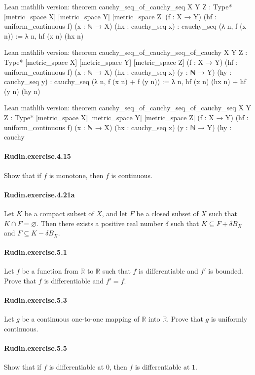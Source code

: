 \documentclass{article}
\begin{document}
Lean mathlib version:
theorem cauchy_seq_of_cauchy_seq {X Y Z : Type*} [metric_space X] [metric_space Y] [metric_space Z]
  (f : X → Y) (hf : uniform_continuous f)
  (x : ℕ → X) (hx : cauchy_seq x) : cauchy_seq (λ n, f (x n)) :=
λ n, hf (x n) (hx n)

Lean mathlib version:
theorem cauchy_seq_of_cauchy_seq_of_cauchy {X Y Z : Type*} [metric_space X] [metric_space Y] [metric_space Z]
  (f : X → Y) (hf : uniform_continuous f)
  (x : ℕ → X) (hx : cauchy_seq x) (y : ℕ → Y) (hy : cauchy_seq y) :
  cauchy_seq (λ n, f (x n) + f (y n)) :=
λ n, hf (x n) (hx n) + hf (y n) (hy n)

Lean mathlib version:
theorem cauchy_seq_of_cauchy_seq_of_cauchy_seq {X Y Z : Type*} [metric_space X] [metric_space Y] [metric_space Z]
  (f : X → Y) (hf : uniform_continuous f)
  (x : ℕ → X) (hx : cauchy_seq x) (y : ℕ → Y) (hy : cauchy

\paragraph{Rudin.exercise.4.15} Show that if $f$ is monotone, then $f$ is continuous.

\paragraph{Rudin.exercise.4.21a} Let $K$ be a compact subset of $X$, and let $F$ be a closed subset of $X$ such that $K \cap F = \varnothing$. Then there exists a positive real number $δ$ such that $K \subseteq F + δ B_X$ and $F \subseteq K - δ B_X$.

\paragraph{Rudin.exercise.5.1} Let $f$ be a function from $\mathbb{R}$ to $\mathbb{R}$ such that $f$ is differentiable and $f'$ is bounded. Prove that $f$ is differentiable and $f' = f$.

\paragraph{Rudin.exercise.5.3} Let $g$ be a continuous one-to-one mapping of $\mathbb{R}$ into $\mathbb{R}$. Prove that $g$ is uniformly continuous.

\paragraph{Rudin.exercise.5.5} Show that if $f$ is differentiable at $0$, then $f$ is differentiable at $1$.
\end{document}
